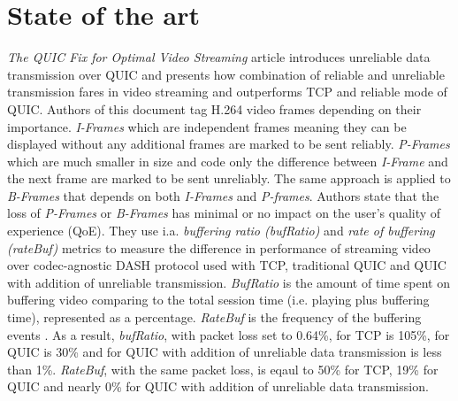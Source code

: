 \section{State of the art}
\label{sec:sota}

\textit{The QUIC Fix for Optimal Video Streaming} article \cite{the-quic-fix-for-optimal-video-streaming} introduces unreliable data transmission over QUIC and presents how combination of reliable and unreliable transmission fares in video streaming and outperforms TCP and reliable mode of QUIC.
Authors of this document tag H.264 video frames depending on their importance.
\textit{I-Frames} which are independent frames meaning they can be displayed without any additional frames are marked to be sent reliably.
\textit{P-Frames} which are much smaller in size and code only the difference between \textit{I-Frame} and the next frame are marked to be sent unreliably.
The same approach is applied to \textit{B-Frames} that depends on both \textit{I-Frames} and \textit{P-frames}.
Authors state that the loss of \textit{P-Frames} or \textit{B-Frames} has minimal or no impact on the user's quality of experience (QoE).
They use i.a. \textit{buffering ratio (bufRatio)} and \textit{rate of buffering (rateBuf)} metrics to measure the difference in performance of streaming video over codec-agnostic DASH protocol used with TCP, traditional QUIC and QUIC with addition of unreliable transmission.
\textit{BufRatio} is the amount of time spent on buffering video comparing to the total session time (i.e. playing plus buffering time), represented as a percentage.
\textit{RateBuf} is the frequency of the buffering events \cite{impact-of-video-quality-on-user-engagement}.
As a result, \textit{bufRatio}, with packet loss set to 0.64\%, for TCP is 105\%, for QUIC is 30\% and for QUIC with addition of unreliable data transmission is less than 1\%.
\textit{RateBuf}, with the same packet loss, is eqaul to 50\% for TCP, 19\% for QUIC and nearly 0\% for QUIC with addition of unreliable data transmission.

